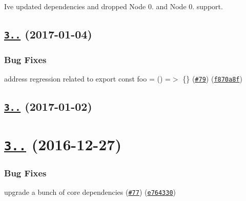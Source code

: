 \begin{DoxyItemize}
\item I\textquotesingle{}ve updated dependencies and dropped Node 0. and Node 0. support.
\end{DoxyItemize}

\label{_3.1.2}%
 \subsection*{\href{https://github.com/istanbuljs/babel-plugin-istanbul/compare/v3.1.1...v3.1.2}{\tt 3..} (2017-\/01-\/04)}

\subsubsection*{Bug Fixes}


\begin{DoxyItemize}
\item address regression related to export const foo = () =$>$ \{\} (\href{https://github.com/istanbuljs/babel-plugin-istanbul/issues/79}{\tt \#79}) (\href{https://github.com/istanbuljs/babel-plugin-istanbul/commit/f870a8f}{\tt f870a8f})
\end{DoxyItemize}

\label{_3.1.1}%
 \subsection*{\href{https://github.com/istanbuljs/babel-plugin-istanbul/compare/v3.1.0...v3.1.1}{\tt 3..} (2017-\/01-\/02)}

\label{_3.1.0}%
 \section*{\href{https://github.com/istanbuljs/babel-plugin-istanbul/compare/v3.0.0...v3.1.0}{\tt 3..} (2016-\/12-\/27)}

\subsubsection*{Bug Fixes}


\begin{DoxyItemize}
\item upgrade a bunch of core dependencies (\href{https://github.com/istanbuljs/babel-plugin-istanbul/issues/77}{\tt \#77}) (\href{https://github.com/istanbuljs/babel-plugin-istanbul/commit/e764330}{\tt e764330})
\end{DoxyItemize}

